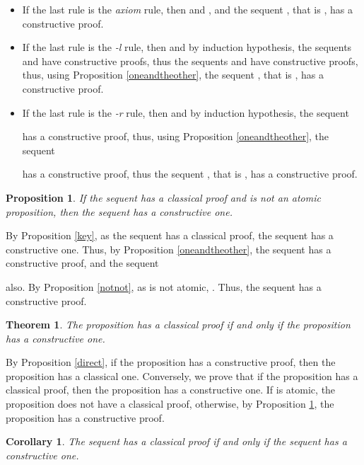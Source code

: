 \documentclass{article}
\newtheorem{proposition}{Proposition}
\newtheorem{theorem}{Theorem}
\newtheorem{corollary}{Corollary}
\begin{document}
\begin{itemize}

\item If the last rule is the {\em axiom} rule, then  and , and the sequent , that is , has a constructive proof.

\item If the last rule is the {\em -l} rule, then
 and by induction hypothesis,
the sequents  and
 have constructive proofs,
thus the sequents  and
 have constructive proofs,
thus, using Proposition \ref{oneandtheother}, 
the sequent , 
that is
, has a constructive proof.

\item If the last rule is the {\em -r} rule, then 
 and by induction hypothesis, 
the sequent 

has a constructive proof, 
thus, using Proposition \ref{oneandtheother}, the sequent 

has a constructive proof, 
thus the sequent
,
that is  , has a constructive proof.
\end{itemize}

\begin{proposition}\label{nonatom}
If the sequent  has a classical proof and  is not 
an atomic proposition, then 
the sequent  has a constructive one.
\end{proposition}

By Proposition \ref{key}, as the sequent  has a 
classical proof, the sequent  has a constructive 
one.
Thus, by Proposition \ref{oneandtheother}, the sequent  
has a constructive proof, and the sequent 
 
also.
By Proposition \ref{notnot}, as 
 is not atomic, . Thus, the sequent 
 has a constructive proof.

\begin{theorem}\label{main}
The proposition  has a classical proof if and only if the proposition
 has a constructive one.
\end{theorem}

By Proposition \ref{direct}, if the proposition  has a
constructive proof, then the proposition  has a classical one.
Conversely, we prove that if the proposition  has a classical
proof, then the proposition  has a constructive one.  If 
is atomic, the proposition  does not have a classical proof,
otherwise, by Proposition \ref{nonatom}, the proposition  has
a constructive proof.

\begin{corollary}
The sequent  has a classical proof 
if and only if the sequent  has a constructive one.
\end{corollary}
\end{document}
